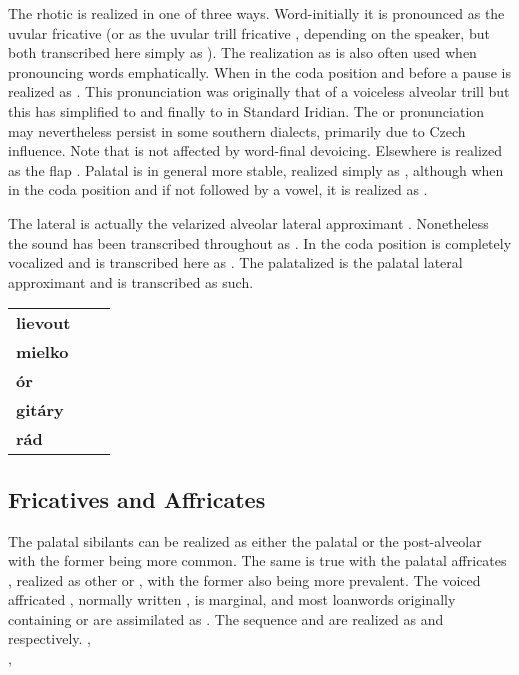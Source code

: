 The rhotic  is realized in one of three ways. Word-initially it is pronounced as the uvular fricative \nt{\textinvscr} (or as the uvular trill fricative \nt{\textraising{\textscr}}, depending on the speaker, but both transcribed here simply as \nt{\rrr}). The realization as \nt{\rrr} is also often used when pronouncing words emphatically. When in the coda position and before a pause  is realized as \bt{\textctz}. This pronunciation was originally that of a voiceless alveolar trill  but this has simplified to  and finally to \nt{\textctz} in Standard Iridian. The  or  pronunciation may nevertheless persist in some southern dialects, primarily due to Czech influence. Note that \nt{\textctz} is not affected by word-final devoicing. Elsewhere  is realized as the flap . Palatal  is in general more stable, realized simply as , although when in the coda position and if not followed by a vowel, it is realized as \nt{\textctz}.

The lateral  is actually the velarized alveolar lateral approximant \nt{\textltilde}. Nonetheless the sound has been transcribed throughout as . In the coda position  is completely vocalized and is transcribed here as . The palatalized  is the palatal lateral approximant  and is transcribed as such.

\ex
	{\small
	\begin{tabularx}{0.8\textwidth}{>{\bfseries}YYY}
		lievout		&  	& \\
		mielko	 	& 		& \\
		\'or		& 				& \\
		git\'ary	& 		& \\
		r\'ad		& 			& \\
	\end{tabularx}}
\xe

\subsection{Fricatives and Affricates}
The palatal sibilants  can be realized as either the palatal  or the post-alveolar  with the former being more common. The same is true with the palatal affricates , realized as other  or , with the former also being more prevalent. The voiced affricated , normally written , is marginal, and most loanwords originally containing  or  are assimilated as \nt{\zz}. The sequence  and  are realized as  and  respectively.
\ex
{}, \\
\xe
\ex
{}, \\
\xe

